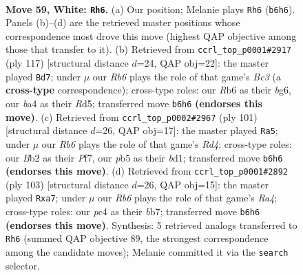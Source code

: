 \documentclass[11pt]{article}
\begin{document}
\clearpage

\begin{figure}[p]\centering
\begin{subfigure}{0.46\textwidth}\centering
\resizebox{\linewidth}{!}{%
\newchessgame
\chessboard[
  setfen={6k1/8/1R6/pp4r1/b1p5/P1P5/1B3K2/8 w - - 24 59},
  showmover=false,
  pgfstyle=straightmove, color=movearrow, markmove={b6-h6}
]}
\caption{}
\end{subfigure}\hfill
\begin{subfigure}{0.46\textwidth}\centering
\resizebox{\linewidth}{!}{%
\newchessgame
\chessboard[
  setfen={5k2/6p1/2b3Bp/3r1p1P/P7/1P2R3/8/4K3 b - - 14 59},
  showmover=false,
  pgfstyle=straightmove, color=movearrow, markmove={c6-d7}
]}
\caption{}
\end{subfigure}
\\[4pt]
\begin{subfigure}{0.46\textwidth}\centering
\resizebox{\linewidth}{!}{%
\newchessgame
\chessboard[
  setfen={8/5p2/5k1p/3r4/2b4P/6P1/5P2/3BR1K1 b - - 29 51},
  showmover=false,
  pgfstyle=straightmove, color=movearrow, markmove={d5-a5}
]}
\caption{}
\end{subfigure}\hfill
\begin{subfigure}{0.46\textwidth}\centering
\resizebox{\linewidth}{!}{%
\newchessgame
\chessboard[
  setfen={8/PB6/8/r1k5/7p/6bP/1R2K1P1/8 b - - 0 52},
  showmover=false,
  pgfstyle=straightmove, color=movearrow, markmove={a5-a7}
]}
\caption{}
\end{subfigure}
\caption{\textbf{Move 59, White: \texttt{Rh6}.} (a) Our position; Melanie plays \texttt{Rh6} (\texttt{b6h6}). Panels (b)--(d) are the retrieved master positions whose correspondence most drove this move (highest QAP objective among those that transfer to it). (b) Retrieved from \texttt{ccrl\_top\_p0001\#2917} (ply 117) [structural distance $d$=24, QAP obj=22]: the master played \texttt{Bd7}; under $\mu$ our \emph{Rb6} plays the role of that game's \emph{Bc3} (a \textbf{cross-type} correspondence); cross-type roles: our \emph{R}b6 as their \emph{b}g6, our \emph{b}a4 as their \emph{R}d5; transferred move \texttt{b6h6} \textbf{(endorses this move)}. (c) Retrieved from \texttt{ccrl\_top\_p0002\#2967} (ply 101) [structural distance $d$=26, QAP obj=17]: the master played \texttt{Ra5}; under $\mu$ our \emph{Rb6} plays the role of that game's \emph{Rd4}; cross-type roles: our \emph{B}b2 as their \emph{P}f7, our \emph{p}b5 as their \emph{b}d1; transferred move \texttt{b6h6} \textbf{(endorses this move)}. (d) Retrieved from \texttt{ccrl\_top\_p0001\#2892} (ply 103) [structural distance $d$=26, QAP obj=15]: the master played \texttt{Rxa7}; under $\mu$ our \emph{Rb6} plays the role of that game's \emph{Ra4}; cross-type roles: our \emph{p}c4 as their \emph{b}b7; transferred move \texttt{b6h6} \textbf{(endorses this move)}. Synthesis: 5 retrieved analogs transferred to \texttt{Rh6} (summed QAP objective 89, the strongest correspondence among the candidate moves); Melanie committed it via the \texttt{search} selector.}
\label{fig:thought-m116}
\end{figure}
\end{document}
